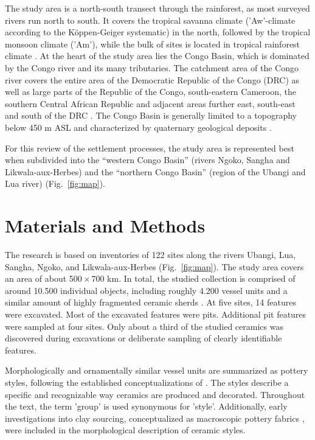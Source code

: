 \documentclass[smallextended,natbib]{svjour3}       %
\begin{document}
The study area is a north-south transect through the rainforest, as most surveyed rivers run north to south. It covers the tropical savanna climate ('Aw'-climate according to the Köppen-Geiger systematic) in the north, followed by the tropical monsoon climate ('Am'), while the bulk of sites is located in tropical rainforest climate \citep['Af';][]{Peel.2007}. At the heart of the study area lies the Congo Basin, which is dominated by the Congo river and its many tributaries. The catchment area of the Congo river covers the entire area of the Democratic Republic of the Congo (DRC) as well as large parts of the Republic of the Congo, south-eastern Cameroon, the southern Central African Republic and adjacent areas further east, south-east and south of the DRC \citep[60 Fig. 1]{Eggert.2017}. The Congo Basin is generally limited to a topography below 450 m ASL \citep[11]{Runge.2001} and characterized by quaternary geological deposits \citep{Persits.1997}.

For this review of the settlement processes, the study area is represented best when subdivided into the “western Congo Basin” (rivers Ngoko, Sangha and Likwala-aux-Herbes) and the “northern Congo Basin” (region of the Ubangi and Lua river) (Fig.~\ref{fig:map}).

\section*{Materials and Methods}\label{materials}

The research is based on inventories of 122 sites along the rivers Ubangi, Lua, Sangha, Ngoko, and Likwala-aux-Herbes (Fig.~\ref{fig:map}). The study area covers an area of about 500\,$\times$\,700 km. In total, the studied collection is comprised of around 10.500 individual objects, including roughly 4.200 vessel units and a similar amount of highly fragmented ceramic sherds \citep[23--43]{Seidensticker.2021e}. At five sites, 14 features were excavated. Most of the excavated features were pits. Additional pit features were sampled at four sites. Only about a third of the studied ceramics was discovered during excavations or deliberate sampling of clearly identifiable features.

Morphologically and ornamentally similar vessel units are summarized as pottery styles, following the established conceptualizations of \citet[52--57]{Wotzka.1995}. The styles describe a specific and recognizable way ceramics are produced and decorated. Throughout the text, the term 'group' is used synonymous for 'style'. Additionally, early investigations into clay sourcing, conceptualized as macroscopic pottery fabrics \citep[60--69]{Seidensticker.2021e}, were included in the morphological description of ceramic styles.
\end{document}
